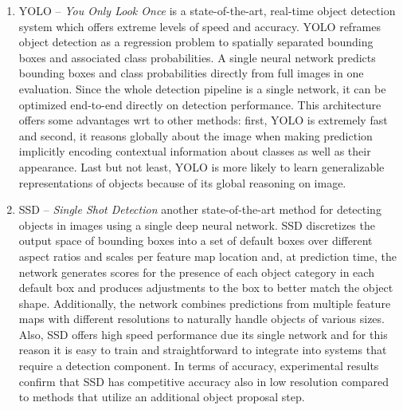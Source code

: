 \begin{enumerate}[label=(\alph*)]
  \item YOLO -- \emph{You Only Look Once} is a state-of-the-art,
  real-time object detection system which offers extreme levels of
  speed and accuracy. YOLO reframes object detection as a regression
  problem to spatially separated bounding boxes and associated class
  probabilities. A single neural network predicts bounding boxes and
  class probabilities directly from full images in one evaluation.
  Since the whole detection pipeline is a single network, it can be
  optimized end-to-end directly on detection performance. This
  architecture offers some advantages wrt to other methods: first,
  YOLO is extremely fast and second, it reasons globally about the
  image when making prediction implicitly encoding contextual
  information about classes as well as their appearance. Last but not
  least, YOLO is more likely to learn generalizable representations of
  objects because of its global reasoning on image.
  \item SSD -- \emph{Single Shot Detection} another state-of-the-art
  method for detecting objects in images using a single deep neural
  network. SSD discretizes the output space of bounding boxes into a
  set of default boxes over different aspect ratios and scales per
  feature map location and, at prediction time, the network generates
  scores for the presence of each object category in each default box
  and produces adjustments to the box to better match the object
  shape. Additionally, the network combines predictions from multiple
  feature maps with diﬀerent resolutions to naturally handle objects
  of various sizes. Also, SSD offers high speed performance due its
  single network and for this reason it is easy to train and
  straightforward to integrate into systems that require a detection
  component. In terms of accuracy, experimental results conﬁrm that
  SSD has competitive accuracy also in low resolution compared to
  methods that utilize an additional object proposal step.
\end{enumerate}


